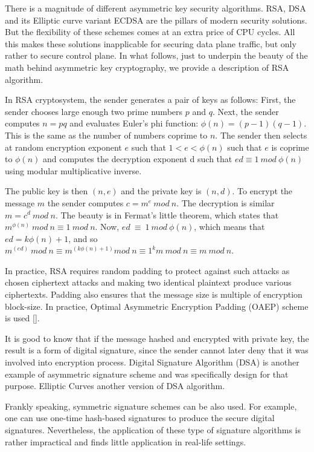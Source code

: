 There is a magnitude of different asymmetric key security algorithms. 
RSA, DSA and its Elliptic curve variant ECDSA are the pillars of modern 
security solutions. But the flexibility of these schemes comes at an extra 
price of CPU cycles. All this makes these solutions inapplicable for securing 
data plane traffic, but only rather to secure control plane. In what follows, 
just to underpin the beauty of the math behind asymmetric key cryptography, 
we provide a description of RSA algorithm.

In RSA cryptosystem, the sender generates a pair of keys as follows: 
First, the sender chooses large enough two prime numbers $p$ and $q$. Next, 
the sender computes $n=pq$ and evaluates Euler’s phi function: $\phi(n)=(p-1)(q-1)$. 
This is the same as the number of numbers coprime to $n$. The sender then selects at 
random encryption exponent $e$ such that $1<e<\phi(n)$ such that $e$ is coprime to $\phi(n)$ 
and computes the decryption exponent d such that $ed \equiv 1\ mod\ \phi(n)$ using modular 
multiplicative inverse.

The public key is then $(n, e)$ and the private key is $(n, d)$. To encrypt the message $m$ 
the sender computes $c= m^e\ mod\ n$. The decryption is similar $m = c^d\ mod\ n$. The beauty is 
in Fermat’s little theorem, which states that $m^{\phi(n)}\ mod\ n \equiv 1\ mod\ n$. 
Now, $ed\ \equiv\ 1\ mod\ \phi(n)$, which means that 
$ed=k\phi(n)+1$, and so $m^{(ed)}\ mod\ n \equiv m^{(k\phi(n)+1)} mod\ n \equiv 1^k m\ mod\ n \equiv m\ mod\ n$. 

In practice, RSA requires random padding to protect against such attacks as chosen ciphertext 
attacks and making two identical plaintext produce various ciphertexts. Padding also ensures that the 
message size is multiple of encryption block-size. In practice, Optimal Asymmetric Encryption Padding (OAEP) 
scheme is used [].

It is good to know that if the message hashed and encrypted with private key, the result is a 
form of digital signature, since the sender cannot later deny that it was involved into encryption 
process. Digital Signature Algorithm (DSA) is another example of asymmetric signature scheme and 
was specifically design for that purpose. Elliptic Curves another version of DSA algorithm.

Frankly speaking, symmetric signature schemes can be also used. For example, one can use 
one-time hash-based signatures to produce the secure digital signatures. Nevertheless, 
the application of these type of signature algorithms is rather impractical and finds 
little application in real-life settings.

